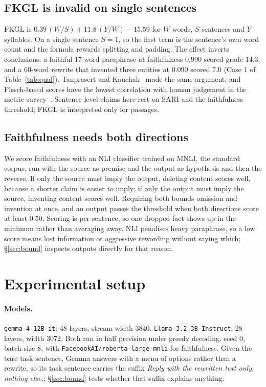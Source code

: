 \documentclass[aps,prb,reprint,nofootinbib,a4paper]{revtex4-2}
\newcommand{\code}[1]{\texttt{\small #1}}
\begin{document}
\subsection{FKGL is invalid on single sentences}
\label{sec:fkgl}

FKGL is $0.39\,(W/S) + 11.8\,(Y/W) - 15.59$ for $W$ words, $S$ sentences and
$Y$ syllables. On a single sentence $S=1$, so the first term is the sentence's
own word count and the formula rewards splitting and padding. The effect
inverts conclusions: a faithful 17-word paraphrase at faithfulness $0.990$
scored grade $14.3$, and a 60-word rewrite that invented three entities at
$0.090$ scored $7.0$ (Case 1 of Table~\ref{tab:qual}). Tanprasert and
Kauchak~\cite{tanprasert2021} made the same argument, and Flesch-based scores
have the lowest correlation with human judgement in the metric
survey~\cite{alvamanchego2021}. Sentence-level claims here rest on SARI and the
faithfulness threshold; FKGL is interpreted only for passages.

\subsection{Faithfulness needs both directions}
\label{sec:nli}

We score faithfulness with an NLI classifier trained on MNLI, the standard
corpus, run with the source as premise and the output as hypothesis and then
the reverse. If only the source must imply the output, deleting content scores
well, because a shorter claim is easier to imply; if only the output must imply
the source, inventing content scores well. Requiring both bounds omission and
invention at once, and an output passes the threshold when both directions
score at least $0.50$. Scoring is per sentence, so one dropped fact shows up in
the minimum rather than averaging away. NLI penalises heavy paraphrase, so a
low score means lost information or aggressive rewording without saying which;
\S\ref{sec:bound} inspects outputs directly for that reason.

\section{Experimental setup}
\label{sec:setup}

\paragraph{Models.} \code{gemma-4-12B-it}: 48 layers, stream width 3840.
\code{Llama-3.2-3B-Instruct}: 28 layers, width 3072. Both run in half
precision under greedy decoding, seed 0, batch size 8, with
\code{FacebookAI/roberta-large-mnli} for faithfulness. Given the bare task
sentence, Gemma answers with a menu of options rather than a rewrite, so its
task sentence carries the suffix \emph{Reply with the rewritten text only,
nothing else.}; \S\ref{sec:bound} tests whether that suffix explains anything.
\end{document}
